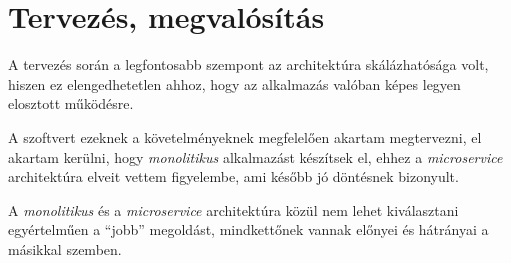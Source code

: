 \chapter{Tervezés, megvalósítás}

A tervezés során a legfontosabb szempont az architektúra skálázhatósága volt,
hiszen ez elengedhetetlen ahhoz, hogy az alkalmazás valóban képes legyen
elosztott működésre.

A szoftvert ezeknek a követelményeknek megfelelően akartam megtervezni,
el akartam kerülni, hogy \emph{monolitikus} alkalmazást készítsek el,
ehhez a \emph{microservice} architektúra elveit vettem figyelembe,
ami később jó döntésnek bizonyult.

A \emph{monolitikus} és a \emph{microservice} architektúra közül nem lehet
kiválasztani egyértelműen a ``jobb'' megoldást, mindkettőnek vannak előnyei
és hátrányai a másikkal szemben.









